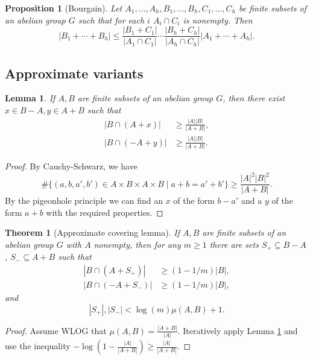 \documentclass[letterpaper,11pt]{article}
\newtheorem{thm}{Theorem}
\newtheorem{lem}{Lemma}
\newtheorem{prop}{Proposition}
\theoremstyle{definition}
\theoremstyle{remark}
\begin{document}
\begin{prop}[Bourgain]\label{large-intersection} Let $A_1, ..., A_h, B_1, ..., B_h, C_1, ..., C_h$ be finite subsets of an abelian group $G$ such that for each $i$ $A_i\cap C_i$ is nonempty. Then
\[
|B_1 + \cdots + B_h| \le \frac{|B_1+C_1|}{|A_1\cap C_1|}\cdots\frac{|B_h+C_h|}{|A_h\cap C_h|}|A_1 + \cdots + A_h|.
\]
\end{prop}

\subsection{Approximate variants}

\begin{lem}\label{addone} If $A,B$ are finite subsets of an abelian group $G$, then there exist $x\in B-A, y\in A+B$ such that
\begin{align*}
|B\cap (A+x)| &\ge \frac{|A||B|}{|A+B|},\\
|B\cap (-A + y)| &\ge \frac{|A||B|}{|A+B|}.
\end{align*}
\end{lem}
\begin{proof} By Cauchy-Schwarz, we have
\[
\#\{(a,b,a',b')\in A\times B\times A\times B\mid a+b = a'+b'\} \ge \frac{|A|^2|B|^2}{|A+B|}.
\]
By the pigeonhole principle we can find an $x$ of the form $b-a'$ and a $y$ of the form $a+b$ with the required properties.
\end{proof}

\begin{thm}[Approximate covering lemma]\label{approx-cover} If $A,B$ are finite subsets of an abelian group $G$ with $A$ nonempty, then for any $m \ge 1$ there are sets $S_+ \subseteq B-A$, $S_- \subseteq A+B$ such that
\begin{align*}
|B\cap (A+S_+)| &\ge (1-1/m)|B|,\\
|B\cap (-A+S_-)| &\ge (1-1/m)|B|,
\end{align*}
and
\[
|S_+|, |S_-| < \log(m)\mu(A,B)+1.
\]
\end{thm}
\begin{proof} Assume WLOG that $\mu(A,B) = \frac{|A+B|}{|A|}$. Iteratively apply Lemma \ref{addone} and use the inequality $-\log(1-\frac{|A|}{|A+B|}) \ge \frac{|A|}{|A+B|}$.
\end{proof}
\end{document}

